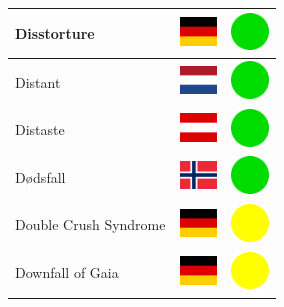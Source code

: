 \documentclass[12pt, a4paper, twoside]{report}
\begin{document}
\begin{center}
\begin{longtable}{|p{5cm}|p{2cm}|p{2cm}|}
 Disstorture                                                & \includegraphics[width=1cm]{../img/flags/de} &   \includegraphics[width=1cm]{../likes/y} \\ \hline
 Distant                                                    & \includegraphics[width=1cm]{../img/flags/nl} &   \includegraphics[width=1cm]{../likes/y} \\ \hline
 Distaste                                                   & \includegraphics[width=1cm]{../img/flags/at} &   \includegraphics[width=1cm]{../likes/y} \\ \hline
 Dødsfall                                                   & \includegraphics[width=1cm]{../img/flags/no} &   \includegraphics[width=1cm]{../likes/y} \\ \hline
 Double Crush Syndrome                                      & \includegraphics[width=1cm]{../img/flags/de} &   \includegraphics[width=1cm]{../likes/m} \\ \hline
 Downfall of Gaia                                           & \includegraphics[width=1cm]{../img/flags/de} &   \includegraphics[width=1cm]{../likes/m} \\ \hline

\end{longtable}
\end{center}
\end{document}
